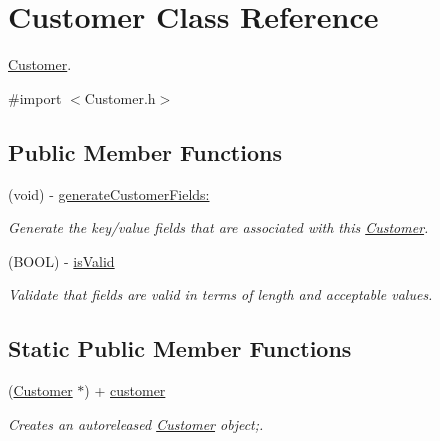 \hypertarget{interface_customer}{
\section{Customer Class Reference}
\label{interface_customer}
}


\hyperlink{interface_customer}{Customer}.  




{\ttfamily \#import $<$Customer.h$>$}

\subsection*{Public Member Functions}
\begin{DoxyCompactItemize}
\item 
(void) -\/ \hyperlink{interface_customer_ab5fea43721bc22171e489fdaba63158e}{generateCustomerFields:}
\begin{DoxyCompactList}\small\item\em Generate the key/value fields that are associated with this \hyperlink{interface_customer}{Customer}. \item\end{DoxyCompactList}\item 
(BOOL) -\/ \hyperlink{interface_customer_aa3ee8895a07974cf0965f909b6fe32f2}{isValid}
\begin{DoxyCompactList}\small\item\em Validate that fields are valid in terms of length and acceptable values. \item\end{DoxyCompactList}\end{DoxyCompactItemize}
\subsection*{Static Public Member Functions}
\begin{DoxyCompactItemize}
\item 
(\hyperlink{interface_customer}{Customer} $\ast$) + \hyperlink{interface_customer_a252228fa61013349a049cb0e85c6f48d}{customer}
\begin{DoxyCompactList}\small\item\em Creates an autoreleased \hyperlink{interface_customer}{Customer} object;. \item\end{DoxyCompactList}\end{DoxyCompactItemize}
